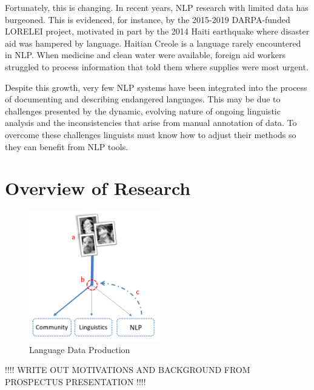 Fortunately, this is changing. In recent years, NLP research with limited data has burgeoned. This is evidenced, for instance, by the 2015-2019 DARPA-funded LORELEI project, motivated in part by the 2014 Haiti earthquake where disaster aid was hampered by language. Haitian Creole is a language rarely encountered in NLP. When medicine and clean water were available, foreign aid workers struggled to process information that told them where supplies were most urgent. 

Despite this growth, very few NLP systems have been integrated into the process of documenting and describing endangered languages. This may be due to challenges presented by the dynamic, evolving nature of ongoing linguistic analysis and the inconsistencies that arise from manual annotation of data. To overcome these challenges linguists must know how to adjust their methods
so they can benefit from NLP tools.


\section{Overview of Research}

\begin{figure}[b]
\centering
\includegraphics[width=5.75cm]{figs/Flowchart.PNG}
\caption[Language Data Production]{Language Data Production}
\label{fig:flowchart}
\end{figure}


!!!! WRITE OUT MOTIVATIONS AND BACKGROUND FROM PROSPECTUS PRESENTATION !!!!

